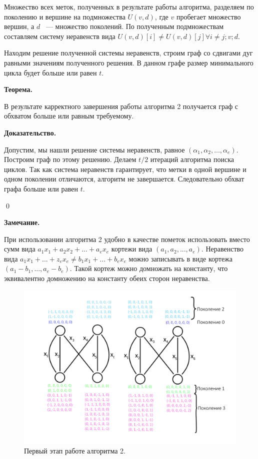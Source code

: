 \documentclass[14pt]{mmcs_article}
\begin{document}
Множество всех меток, полученных в результате работы алгоритма, разделяем по поколению и вершине на подмножества $U(v, d)$, где $v$ пробегает множество вершин, а $d$ ~--- множество поколений. По полученным подмножествам составляем систему неравенств вида $U(v, d)[i] \neq U(v,d)[j] \forall i \neq j; v; d$.

Находим решение полученной системы неравенств, строим граф со сдвигами дуг равными значениям полученного решения. В данном графе размер минимального цикла будет больше или равен $t$. 

\textbf{Теорема.}

В результате карректного завершения работы алгоритма 2 получается граф с обхватом больше или равным требуемому.

\textbf{Доказательство.}

Допустим, мы нашли решение системы неравенств, равное $(\alpha_1, \alpha_2, ..., \alpha_e)$. Построим граф по этому решению. Делаем $t/2$ итераций алгоритма поиска циклов. Так как система неравенств гарантирует, что метки в одной вершине и одном поколении отличаются, алгоритм не завершается. Следовательно обхват графа больше или равен $t$.

\qed

\textbf{Замечание.}

При использовании алгоритма 2 удобно в качестве пометок использовать вместо сумм вида $a_1 x_1 + a_2 x_2 + ... + a_e x_e$ кортежи вида $(a_1, a_2, ..., a_e)$. Неравенство вида $a_1 x_1 + ... + z_e x_e \neq b_1 x_1 + ... + b_e x_e$ можно записывать в виде кортежа $(a_1 - b_1, ..., a_e - b_e)$. Такой кортеж можно домножать на константу, что эквивалентно домножению на константу обеих сторон неравенства. 

\begin{figure}[H]
  \centering
  \includegraphics[scale=0.5]{Fig_6.png}
  \caption{ Первый этап работе алгоритма 2. }
  \label{image:6}
\end{figure}
\end{document}
